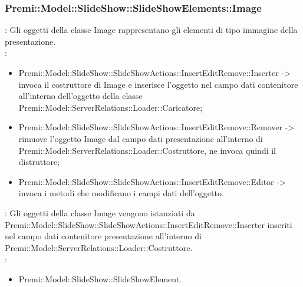{                    \subsubsection{Premi::Model::SlideShow::SlideShowElements::Image}{
				\textbf{\tipo}: Gli oggetti della classe Image rappresentano gli elementi di tipo immagine della presentazione.\\
				\textbf{\relaz}: 
				\begin{itemize}
					\item Premi::Model::SlideShow::SlideShowActions::InsertEditRemove::Inserter -> invoca il costruttore di Image e inserisce l’oggetto nel campo dati contenitore all’interno dell’oggetto della classe Premi::Model::ServerRelations::Loader::Caricatore;
                    \item Premi::Model::SlideShow::SlideShowActions::InsertEditRemove::Remover -> rimuove l’oggetto Image dal campo dati presentazione all’interno di Premi::Model::ServerRelations::Loader::Costruttore, ne invoca quindi il distruttore;
                    \item Premi::Model::SlideShow::SlideShowActions::InsertEditRemove::Editor ->  invoca i metodi che modificano i campi dati dell'oggetto.
				\end{itemize}	
                \textbf{\interfacce}: Gli oggetti della classe Image vengono istanziati da Premi::Model::SlideShow::SlideShowActions::InsertEditRemove::Inserter  inseriti nel campo dati contenitore presentazione all’interno di Premi::Model::ServerRelations::Loader::Costruttore.\\
                \textbf{\base}: 
                    \begin{itemize}
                    \item Premi::Model::SlideShow::SlideShowElement.
                    \end{itemize}
                    }
}
